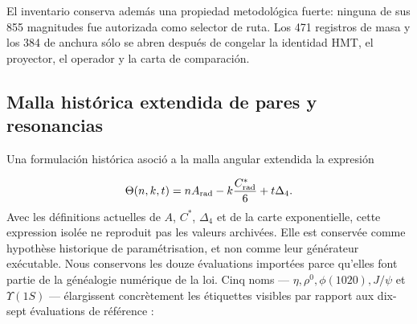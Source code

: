 El inventario conserva además una propiedad metodológica fuerte: ninguna de sus 855 magnitudes fue autorizada como selector de ruta. Los 471 registros de masa y los 384 de anchura sólo se abren después de congelar la identidad HMT, el proyector, el operador y la carta de comparación.

\iffalse
{}
\subsection{Malla histórica extendida de pares y resonancias}
Una formulación histórica asoció a la malla angular extendida la expresión

\[
\Theta(n,k,t)
=nA_{\rm rad}-k\frac{C^*_{\rm rad}}6+t\Delta_4.
\]
Avec les définitions actuelles de \(A\), \(C^*\), \(\Delta_4\) et de la carte exponentielle, cette expression isolée ne reproduit pas les valeurs archivées. Elle est conservée comme hypothèse historique de paramétrisation, et non comme leur générateur exécutable. Nous conservons les douze évaluations importées parce qu'elles font partie de la généalogie numérique de la loi. Cinq noms --- \(\eta,\rho^0,\phi(1020),J/\psi\) et \(\Upsilon(1S)\) --- élargissent concrètement les étiquettes visibles par rapport aux dix-sept évaluations de référence :

